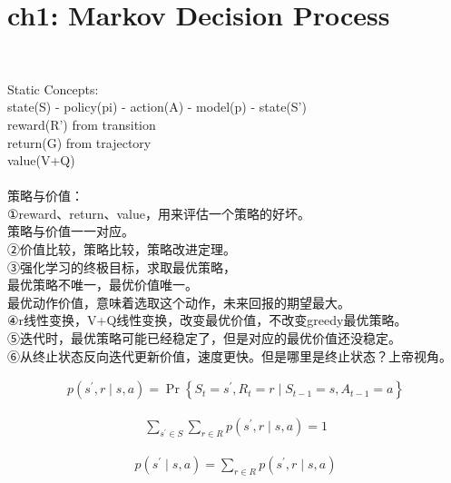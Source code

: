 \documentclass{article}
\begin{document}
\section*{ch1: Markov Decision Process}


~ \\[3pt]
\begin{CJK}{UTF8}{gbsn}
    Static Concepts: \\[3pt]
    state(S) - policy(pi) - action(A) - model(p) - state(S') \\[3pt]
    reward(R') from transition \\[3pt]
    return(G) from trajectory \\[3pt]
    value(V+Q) \\[3pt]

    ~ \\[3pt]
    策略与价值：\\[3pt]
    ①reward、return、value，用来评估一个策略的好坏。 \\[3pt]
    策略与价值一一对应。 \\[3pt]
    ②价值比较，策略比较，策略改进定理。 \\[3pt]
    ③强化学习的终极目标，求取最优策略， \\[3pt]
    最优策略不唯一，最优价值唯一。 \\[3pt]
    最优动作价值，意味着选取这个动作，未来回报的期望最大。 \\[3pt]
    ④r线性变换，V+Q线性变换，改变最优价值，不改变greedy最优策略。 \\[3pt]
    ⑤迭代时，最优策略可能已经稳定了，但是对应的最优价值还没稳定。 \\[3pt]
    ⑥从终止状态反向迭代更新价值，速度更快。但是哪里是终止状态？上帝视角。 \\[3pt]
\end{CJK}


\begin{align*}
    p \left( s^{\prime}, r \mid s, a \right) 
    = \operatorname{Pr} \left\{ S_{t}=s^{\prime}, R_{t}=r \mid 
    S_{t-1}=s, A_{t-1}=a \right\} 
\end{align*}

\begin{align*}
    \sum_{s^{\prime} \in S} \sum_{r \in R} 
    p \left( s^{\prime}, r \mid s, a \right) = 1 
\end{align*}

\begin{align*}
    p \left( s^{\prime} \mid s, a \right) 
    = \sum_{r \in R} p \left( s^{\prime}, r \mid s, a \right) 
\end{align*}
\end{document}
